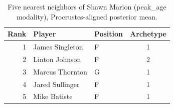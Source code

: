 \begin{table}[htbp]
  \centering\small
  \begin{tabular}{rllc}
    \toprule
    Rank & Player & Position & Archetype \\
    \midrule
    1 & James Singleton & F & 1 \\
    2 & Linton Johnson & F & 2 \\
    3 & Marcus Thornton & G & 1 \\
    4 & Jared Sullinger & F & 1 \\
    5 & Mike Batiste & F & 1 \\
    \bottomrule
  \end{tabular}
  \caption{Five nearest neighbors of Shawn Marion (peak_age modality), Procrustes-aligned posterior mean.}
  \label{tab:Shawn_Marion_neighbors_peak_age}
\end{table}

